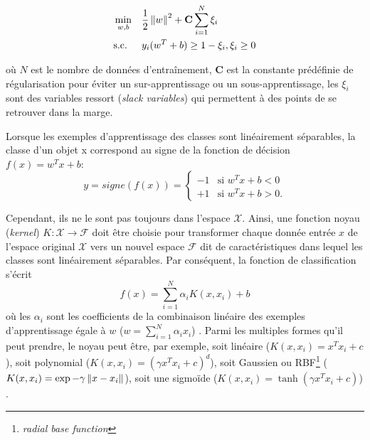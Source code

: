 \begin{equation*}
\begin{aligned}
& \mathop{\mathrm{min}}\limits\limits_{w,b}
& &\frac{1}{2}\left\lVert w\right\rVert^2 + \mathbf{C} \sum\limits^N_{i=1} \xi_i \\
& \text{s.c.}
& & y_i(w^T+b)\geq 1-\xi_i, \xi_i \geq 0
\end{aligned}
\end{equation*}

où $N$ est le nombre de données d'entraînement, $\mathbf{C}$ est la constante prédéfinie de régularisation pour éviter un sur-apprentissage ou un sous-apprentissage, les $\xi_i$ sont des variables ressort (\textit{slack variables}) qui permettent à des points de se retrouver dans la marge. 


Lorsque les exemples d'apprentissage des classes sont linéairement séparables, la classe d'un objet x correspond au signe de la fonction de décision $f(x) = w^T x + b$:
\[
y = signe(f(x))=
\left\{ \begin{array}{ll}
-1 & \text{si }w^Tx+b<0\\
+1 & \text{si }w^Tx+b>0.
\end{array}
\right.
\]


 Cependant, ils ne le sont pas toujours dans l'espace $\mathcal{X}$. Ainsi, une fonction \og noyau \fg{} (\textit{kernel}) $K: \mathcal{X} \longrightarrow \mathcal{F}$ doit être choisie pour transformer chaque donnée entrée $x$ de l'espace original $\mathcal{X}$ vers un nouvel espace $\mathcal{F}$ dit de caractéristiques dans lequel les classes sont linéairement séparables. Par conséquent, la fonction de classification s'écrit \[f(x) = \sum\limits_{i=1}^N \alpha_i K(x,x_i) + b\] où les $\alpha_i$ sont les coefficients de la combinaison linéaire des exemples d'apprentissage égale à $w$ ($w = \sum\limits_{i=1}^N\alpha_i x_i$) \citep{Ben-Hur2010svm}. Parmi les multiples formes qu'il peut prendre, le noyau peut être, par exemple, soit linéaire ($K(x,x_i) = x^Tx_i + c$), soit polynomial ($K(x,x_i) = (\gamma x^Tx_i + c)^d$), soit Gaussien ou RBF\footnote{\textit{radial base function}} ($K(x,x_i) = \exp{-\gamma \left\lVert x-x_i\right\rVert}$), soit une sigmoïde ($K(x,x_i) = \tanh(\gamma x^Tx_i + c)$) \citep{Amami2013PracticalModelSelectionSVM}.

